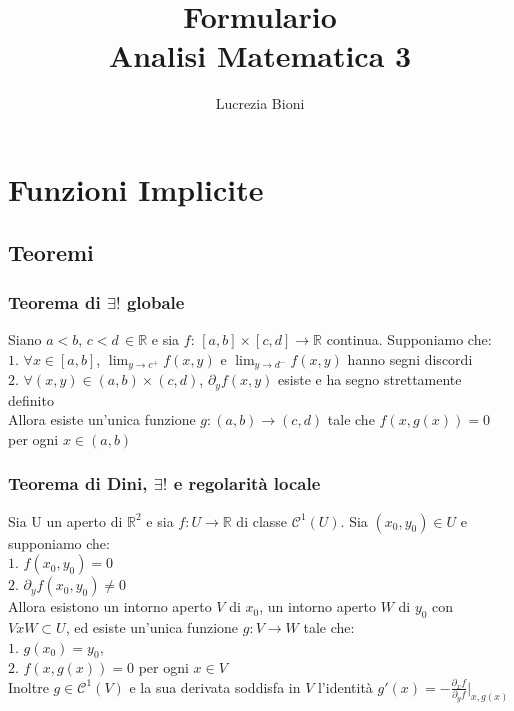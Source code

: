 \documentclass{article} %
\title{%
    \Large Formulario \\
    \large Analisi Matematica 3}
\author{ \small Lucrezia Bioni} %
\date{} %
\begin{document}
    \maketitle

    \section{Funzioni Implicite}
    \subsection{Teoremi}
    \subsubsection*{Teorema di $\exists !$ globale}
    Siano $a<b, \, c<d \, \in \mathbb{R}$ e sia $f: \, [a,b] \times [c,d] \to \mathbb{R}$ continua. Supponiamo che: \\
    $1.$ $\forall x \in [a,b]$, $\lim_{y \to c^+} f(x,y)$ e $\lim_{y \to d^-} f(x,y)$ hanno segni discordi \\
    $2.$ $\forall (x,y) \in (a,b) \times (c,d)$, $\partial_yf(x,y)$ esiste e ha segno strettamente definito \\
    Allora esiste un'unica funzione $g:(a,b) \to (c,d)$ tale che $f(x , g(x))=0$ per ogni $x \in (a,b)$ 
    \subsubsection*{Teorema di Dini, $\exists !$ e regolarità locale}
    Sia U un aperto di $\mathbb{R}^2$ e sia $f:U \to \mathbb{R}$ di classe $\mathcal{C}^1\left(U\right)$. Sia $(x_0,y_0)\in U$ e supponiamo che: \\
    $1.$ $f(x_0,y_0)=0$ \\
    $2.$ $\partial_y f(x_0,y_0) \neq 0$ \\
    Allora esistono un intorno aperto $V$ di $x_0$, un intorno aperto $W$ di $y_0$ con $V x W \subset U$, ed esiste un'unica funzione $g: V \to W$ tale che: \\
    $1.$ $g(x_0)=y_0$, \\
    $2.$ $f(x,g(x))=0$ per ogni $x \in V$ \\
    Inoltre $g \in \mathcal{C}^1(V)$ e la sua derivata soddisfa in $V$ l'identità $g'(x) = - \frac{\partial_x f}{\partial_y f}|_{x,g(x)}$ 
    
\end{document}
